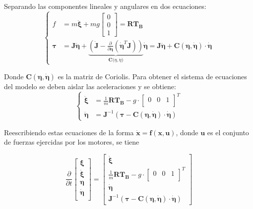 \documentclass[twoside,11pt]{report}
\begin{document}
Separando las componentes lineales y angulares en dos ecuaciones:
\begin{equation}
\begin{cases}
f & = m \pmb{\ddot{\xi}} + mg \left[ \begin{array}{c}
0 \\
0 \\
1
\end{array} \right] =\pmb{R}\pmb{T_B} \\
\pmb{\tau} & =\pmb{J} \pmb{\ddot{\eta}} +  \underbrace{\left( \pmb{\dot{J}} - \frac{\partial}{\partial \pmb{\dot{\eta}}}(\pmb{\dot{\eta}}^{T}\pmb{J})\right)}_{\pmb{C(}\eta,\dot{\eta}\pmb{)}} \pmb{\dot{\eta}} =\pmb{J} \pmb{\ddot{\eta}} +  \pmb{C(\eta,\dot{\eta})}\cdot\pmb{\dot{\eta}} 
\end{cases}
\label{3.24}
\end{equation}

Donde $\pmb{C(\eta,\dot{\eta})}$ es la matriz de Coriolis. 
Para obtener el sistema de ecuaciones del modelo se deben aislar las aceleraciones y se obtiene:
\begin{equation}
\begin{cases}
\pmb{\ddot{\xi}} & =\frac{1}{m}\pmb{R}\pmb{T_{B}} - g \cdot \left[ \begin{array}{ccc}
0 & 0 & 1\\
\end{array} \right]^{T} \\
\pmb{\ddot{\eta}} & =\pmb{J}^{-1} \left( \pmb{\tau} - \pmb{C(\eta,\dot{\eta})}\cdot\pmb{\dot{\eta}}  \right)
\end{cases}
\label{eq:system}
\end{equation}

Reescribiendo estas ecuaciones de la forma $\pmb{\dot{x}}=\pmb{f(x,u)}$, donde $\pmb{u}$ es el conjunto de fuerzas ejercidas por los motores, se tiene 

\begin{equation}
\frac{\partial}{\partial t}\left[ \begin{array}{l}
\pmb{\xi} \\
\pmb{\dot{\xi}} \\
\pmb{\eta} \\
\pmb{\dot{\eta}} \\
\end{array} \right] =\left[ \begin{array}{l}
\pmb{\dot{\xi}} \\
\frac{1}{m}\pmb{R}\pmb{T_{B}} - g \cdot \left[ \begin{array}{ccc}
0 & 0 & 1 \\
\end{array} \right]^{T} \\
\pmb{\dot{\eta}} \\
\pmb{J}^{-1} \left( \pmb{\tau} - \pmb{C(\eta,\dot{\eta})}\cdot\pmb{\dot{\eta}} \right)
\end{array} \right]
\label{eq:system2}
\end{equation}
\end{document}
